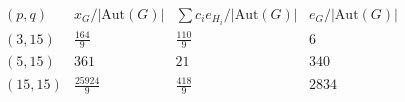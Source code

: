 \[\begin{array}{c|rrr}
(p,q)&x_G/|\mathrm{Aut}(G)|&\sum c_i e_{H_i}/|\mathrm{Aut}(G)|&e_G/|\mathrm{Aut}(G)|\\\hline
(3,15)&\frac{164}{9}&\frac{110}{9}&6\\
(5,15)&361&21&340\\
(15,15)&\frac{25924}{9}&\frac{418}{9}&2834\\
\end{array}\]
